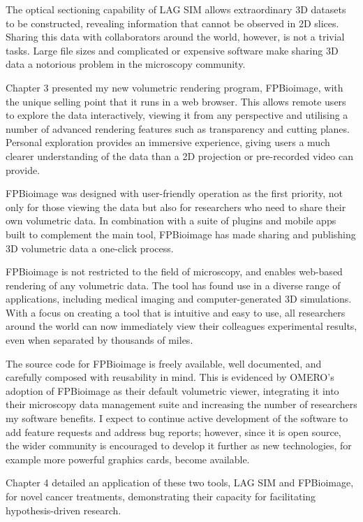 The optical sectioning capability of LAG SIM allows extraordinary 3D datasets to be constructed, revealing information that cannot be observed in 2D slices. 
Sharing this data with collaborators around the world, however, is not a trivial tasks.
Large file sizes and complicated or expensive software make sharing 3D data a notorious problem in the microscopy community. 

Chapter 3 presented my new volumetric rendering program, FPBioimage, with the unique selling point that it runs in a web browser.
This allows remote users to explore the data interactively, viewing it from any perspective and utilising a number of advanced rendering features such as transparency and cutting planes. 
Personal exploration provides an immersive experience, giving users a much clearer understanding of the data than a 2D projection or pre-recorded video can provide. 

FPBioimage was designed with user-friendly operation as the first priority, not only for those viewing the data but also for researchers who need to share their own volumetric data. 
In combination with a suite of plugins and mobile apps built to complement the main tool, FPBioimage has made sharing and publishing 3D volumetric data a one-click process.  

FPBioimage is not restricted to the field of microscopy, and enables 
web-based rendering of any volumetric data. 
The tool has found use in a diverse range of applications, including medical imaging and computer-generated 3D simulations. 
With a focus on creating a tool that is intuitive and easy to use, all researchers around the world can now immediately view their colleagues experimental results, even when separated by thousands of miles. 

The source code for FPBioimage is freely available, well documented, and carefully composed with reusability in mind. 
This is evidenced by OMERO's adoption of FPBioimage as their default volumetric viewer, integrating it into their microscopy data management suite and increasing the number of researchers my software benefits. 
I expect to continue active development of the software to add feature requests and address bug reports; however, since it is open source, the wider community is encouraged to develop it further as new technologies, for example more powerful graphics cards, become available.  

Chapter 4 detailed an application of these two tools, LAG SIM and FPBioimage, for novel cancer treatments, demonstrating their capacity for facilitating hypothesis-driven research. 

